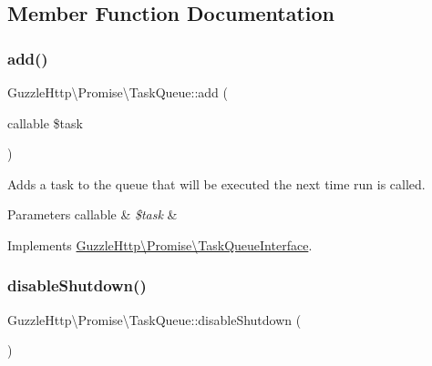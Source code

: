 \subsection{Member Function Documentation}
\mbox{\label{classGuzzleHttp_1_1Promise_1_1TaskQueue_a6f14a0f54a9033aabd6e49b20e3749b3}} 
\subsubsection{\texorpdfstring{add()}{add()}}
{\footnotesize\ttfamily Guzzle\+Http\textbackslash{}\+Promise\textbackslash{}\+Task\+Queue\+::add (\begin{DoxyParamCaption}\item[{callable}]{\$task }\end{DoxyParamCaption})}

Adds a task to the queue that will be executed the next time run is called.


\begin{DoxyParams}[1]{Parameters}
callable & {\em \$task} & \\
\hline
\end{DoxyParams}


Implements \hyperlink{interfaceGuzzleHttp_1_1Promise_1_1TaskQueueInterface_a17ffca73eb81b58d2b5b17711563bf0b}{Guzzle\+Http\textbackslash{}\+Promise\textbackslash{}\+Task\+Queue\+Interface}.

\mbox{\label{classGuzzleHttp_1_1Promise_1_1TaskQueue_a372840aa53b002273396f7f831342155}} 
\subsubsection{\texorpdfstring{disable\+Shutdown()}{disableShutdown()}}
{\footnotesize\ttfamily Guzzle\+Http\textbackslash{}\+Promise\textbackslash{}\+Task\+Queue\+::disable\+Shutdown (\begin{DoxyParamCaption}{ }\end{DoxyParamCaption})}

